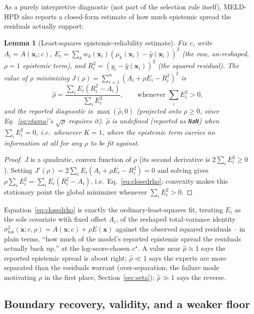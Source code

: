 \documentclass[11pt]{article}
\newtheorem{lemma}{Lemma}[section]
\begin{document}
As a purely interpretive diagnostic (not part of the selection rule itself), MELD-HPD also reports
a closed-form estimate of how much epistemic spread the residuals actually support:

\begin{lemma}[Least-squares epistemic-reliability estimate]
\label{lem:closedrho}
Fix $c$, write $A_i=A(\bm x_i;c)$, $E_i = \sum_k w_k(\bm x_i)(\mu_k(\bm x_i)-\hat y(\bm x_i))^2$
(the \emph{raw}, un-reshaped, $\rho=1$ epistemic term), and $R_i^2=(y_i-\hat y(\bm x_i))^2$ (the
squared residual). The value of $\rho$ minimizing $J(\rho) = \sum_{i=1}^n (A_i+\rho E_i - R_i^2)^2$
is
\begin{equation}
\hat\rho = \frac{\sum_i E_i(R_i^2-A_i)}{\sum_i E_i^2}, \qquad \text{whenever } \sum_i E_i^2>0,
\label{eq:closedrho}
\end{equation}
and the reported diagnostic is $\max(\hat\rho,0)$ (projected onto $\rho\ge0$, since
Eq.~\eqref{eq:etamu}'s $\sqrt\rho$ requires it). $\hat\rho$ is undefined (reported as \texttt{NaN})
when $\sum_i E_i^2=0$, i.e.\ whenever $K=1$, where the epistemic term carries no information at
all for any $\rho$ to be fit against.
\end{lemma}
\begin{proof}
$J$ is a quadratic, convex function of $\rho$ (its second derivative is $2\sum_i E_i^2\ge0$).
Setting $J'(\rho) = 2\sum_i E_i(A_i+\rho E_i-R_i^2)=0$ and solving gives $\rho\sum_i E_i^2 = \sum_i
E_i(R_i^2-A_i)$, i.e.\ Eq.~\eqref{eq:closedrho}; convexity makes this stationary point the global
minimizer whenever $\sum_i E_i^2>0$.
\end{proof}

Equation~\eqref{eq:closedrho} is exactly the ordinary-least-squares fit, treating $E_i$ as the sole
covariate with fixed offset $A_i$, of the reshaped total-variance identity
$\sigma_{\mathrm{tot}}^2(\bm x;c,\rho) = A(\bm x;c) + \rho E(\bm x)$ against the observed squared
residuals -- in plain terms, ``how much of the model's reported epistemic spread the residuals
actually back up,'' at the log-score-chosen $c^\star$. A value near $\hat\rho\approx1$ says the
reported epistemic spread is about right; $\hat\rho\ll1$ says the experts are more separated than
the residuals warrant (over-separation, the failure mode motivating $\rho$ in the first place,
Section~\ref{sec:seta}); $\hat\rho\gg1$ says the reverse.

\subsection{Boundary recovery, validity, and a weaker floor}
\end{document}
